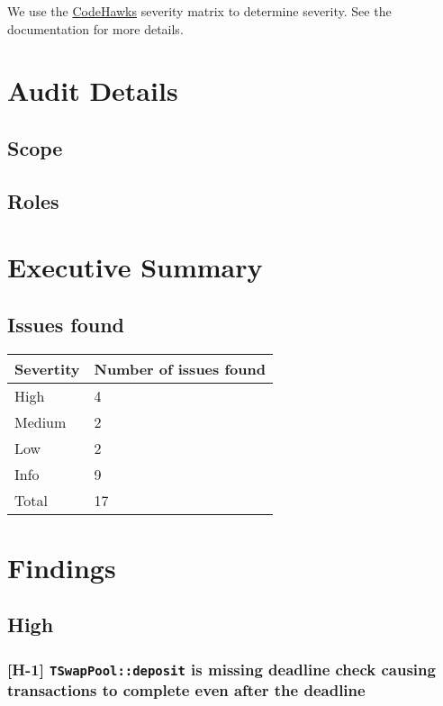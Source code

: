 We use the
\href{https://docs.codehawks.com/hawks-auditors/how-to-evaluate-a-finding-severity}{CodeHawks}
severity matrix to determine severity. See the documentation for more
details.

\section{Audit Details}\label{audit-details}

\subsection{Scope}\label{scope}

\subsection{Roles}\label{roles}

\section{Executive Summary}\label{executive-summary}

\subsection{Issues found}\label{issues-found}

\begin{longtable}[]{@{}ll@{}}
\toprule\noalign{}
Severtity & Number of issues found \\
\midrule\noalign{}
\endhead
\bottomrule\noalign{}
\endlastfoot
High & 4 \\
Medium & 2 \\
Low & 2 \\
Info & 9 \\
Total & 17 \\
\end{longtable}

\section{Findings}\label{findings}

\subsection{High}\label{high}

\subsubsection{\texorpdfstring{{[}H-1{]} \texttt{TSwapPool::deposit} is
missing deadline check causing transactions to complete even after the
deadline}{{[}H-1{]} TSwapPool::deposit is missing deadline check causing transactions to complete even after the deadline}}\label{h-1-tswappooldeposit-is-missing-deadline-check-causing-transactions-to-complete-even-after-the-deadline}

